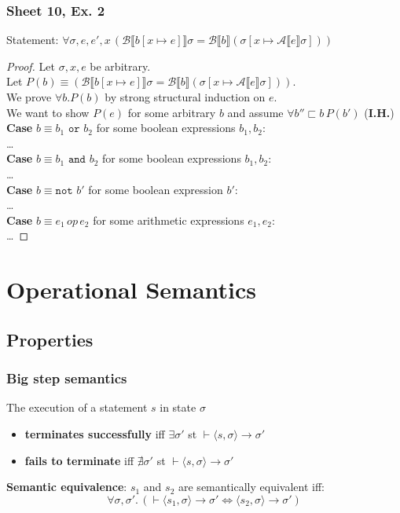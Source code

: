 \documentclass{article}
\def\li{\rightarrow}
\def\A{\mathcal{A}}
\def\B{\mathcal{B}}
\def\nott{\texttt{not }}
\def\andt{\texttt{ and }}
\def\ort{\texttt{ or }}
\def\llb{\llbracket}
\def\rrb{\rrbracket}
\def\la{\langle}
\def\ra{\rangle}
\begin{document}
\subsubsection{Sheet 10, Ex. 2}
Statement: $ \forall \sigma, e, e', x \, (\B \llb b [x \mapsto e]\rrb \sigma = \B \llb b\rrb (\sigma[x \mapsto \A \llb e \rrb \sigma]))$
\begin{proof}
    Let $\sigma, x, e$ be arbitrary. \\
    Let $P(b) \equiv (\B \llb b [x \mapsto e]\rrb \sigma = \B \llb b\rrb (\sigma[x \mapsto \A \llb e \rrb \sigma]))$.\\
    We prove $\forall b. P(b)$ by strong structural induction on $e$. \\
    We want to show $P(e)$ for some arbitrary $b$ and assume $\forall b''  \sqsubset b \, P(b')$ (\textbf{I.H.})\\
    \textbf{Case} $b \equiv b_1 \ort b_2$ for some boolean expressions $b_1,b_2$:\\
    \dots \\
    \textbf{Case} $b \equiv b_1 \andt b_2$ for some boolean expressions $b_1,b_2$:\\
    \dots \\
    \textbf{Case} $b \equiv \nott b'$ for some boolean expression $b'$:\\
    \dots \\
    \textbf{Case} $b \equiv e_1 \, op \, e_2$ for some arithmetic expressions $e_1, e_2$:\\
    \dots 
\end{proof}

\section{Operational Semantics}
\subsection{Properties}
\subsubsection{Big step semantics}
The execution of a statement $s$ in state $\sigma$
\begin{itemize}
    \item \textbf{terminates successfully} iff $\exists \sigma'$ st $\vdash \langle s, \sigma \rangle \li \sigma'$ 
    \item \textbf{fails to terminate} iff $\nexists \sigma'$ st $\vdash \langle s, \sigma \rangle \li \sigma'$ 
\end{itemize}
\textbf{Semantic equivalence}: $s_1$ and $s_2$ are semantically equivalent iff:
$$\forall \sigma, \sigma'. \, (\vdash \la s_1, \sigma\ra \li \sigma' 
\Leftrightarrow
\la s_2, \sigma\ra \li \sigma' 
 )$$
\end{document}
